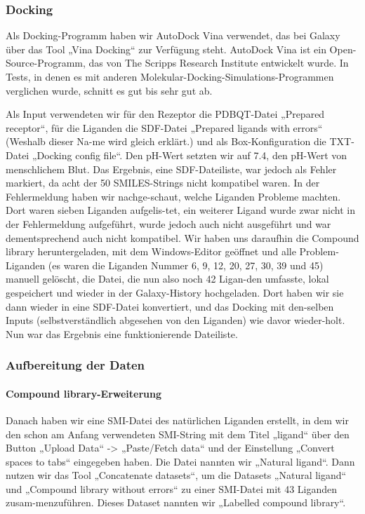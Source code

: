 \documentclass[11pt]{article}
\begin{document}

    \subsubsection{Docking}

    Als Docking-Programm haben wir AutoDock Vina verwendet, das bei Galaxy über das Tool „Vina Docking“ zur Verfügung steht. AutoDock Vina ist ein Open-Source-Programm, das von The Scripps Research Institute entwickelt wurde. In Tests, in denen es mit anderen Molekular-Docking-Simulations-Programmen verglichen wurde, schnitt es gut bis sehr gut ab.


    Als Input verwendeten wir für den Rezeptor die PDBQT-Datei „Prepared receptor“, für die Liganden die SDF-Datei „Prepared ligands with errors“ (Weshalb dieser Na-me wird gleich erklärt.) und als Box-Konfiguration die TXT-Datei „Docking config file“. Den pH-Wert setzten wir auf 7.4, den pH-Wert von menschlichem Blut.
    Das Ergebnis, eine SDF-Dateiliste, war jedoch als Fehler markiert, da acht der 50 SMILES-Strings nicht kompatibel waren. In der Fehlermeldung haben wir nachge-schaut, welche Liganden Probleme machten. Dort waren sieben Liganden aufgelis-tet, ein weiterer Ligand wurde zwar nicht in der Fehlermeldung aufgeführt, wurde jedoch auch nicht ausgeführt und war dementsprechend auch nicht kompatibel. Wir haben uns daraufhin die Compound library heruntergeladen, mit dem Windows-Editor geöffnet und alle Problem-Liganden (es waren die Liganden Nummer 6, 9, 12, 20, 27, 30, 39 und 45) manuell gelöscht, die Datei, die nun also noch 42 Ligan-den umfasste, lokal gespeichert und wieder in der Galaxy-History hochgeladen. Dort haben wir sie dann wieder in eine SDF-Datei konvertiert, und das Docking mit den-selben Inputs (selbstverständlich abgesehen von den Liganden) wie davor wieder-holt.
    Nun war das Ergebnis eine funktionierende Dateiliste.


    \subsubsection{Aufbereitung der Daten}

    \paragraph{Compound library-Erweiterung}
    Danach haben wir eine SMI-Datei des natürlichen Liganden erstellt, in dem wir den schon am Anfang verwendeten SMI-String mit dem Titel „ligand“ über den Button „Upload Data“ -> „Paste/Fetch data“ und der Einstellung „Convert spaces to tabs“ eingegeben haben. Die Datei nannten wir „Natural ligand“.
    Dann nutzen wir das Tool „Concatenate datasets“, um die Datasets „Natural ligand“ und „Compound library without errors“ zu einer SMI-Datei mit 43 Liganden zusam-menzuführen. Dieses Dataset nannten wir „Labelled compound library“.
\end{document}
